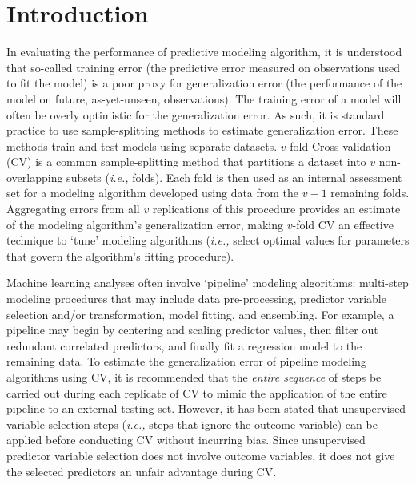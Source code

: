 \documentclass[AMA,STIX1COL,doublespace]{WileyNJD-v2}
\begin{document}

\maketitle

\section{Introduction}

In evaluating the performance of predictive modeling algorithm, it is
understood that so-called training error (the predictive error measured
on observations used to fit the model) is a poor proxy for
generalization error (the performance of the model on future,
as-yet-unseen, observations).\citep{kuhn2013applied} The training error
of a model will often be overly optimistic for the generalization error.
As such, it is standard practice to use sample-splitting methods to
estimate generalization error. These methods train and test models using
separate datasets. \(v\)-fold Cross-validation (CV) is a common
sample-splitting method that partitions a dataset into \(v\)
non-overlapping subsets (\textit{i.e., }folds).\cite{arlot2010survey}
Each fold is then used as an internal assessment set for a modeling
algorithm developed using data from the \(v-1\) remaining folds.
Aggregating errors from all \(v\) replications of this procedure
provides an estimate of the modeling algorithm's generalization error,
making \(v\)-fold CV an effective technique to `tune' modeling
algorithms (\textit{i.e., }select optimal values for parameters that
govern the algorithm's fitting procedure).

Machine learning analyses often involve `pipeline' modeling algorithms:
multi-step modeling procedures that may include data pre-processing,
predictor variable selection and/or transformation, model fitting, and
ensembling.\citep{mlr3} For example, a pipeline may begin by centering
and scaling predictor values, then filter out redundant correlated
predictors, and finally fit a regression model to the remaining data. To
estimate the generalization error of pipeline modeling algorithms using
CV, it is recommended that the \emph{entire sequence} of steps be
carried out during each replicate of CV to mimic the application of the
entire pipeline to an external testing set. However, it has been stated
that unsupervised variable selection steps (\textit{i.e., }steps that
ignore the outcome variable) can be applied before conducting CV without
incurring bias.\citep{hastie2009elements} Since unsupervised predictor
variable selection does not involve outcome variables, it does not give
the selected predictors an unfair advantage during CV.
\end{document}
